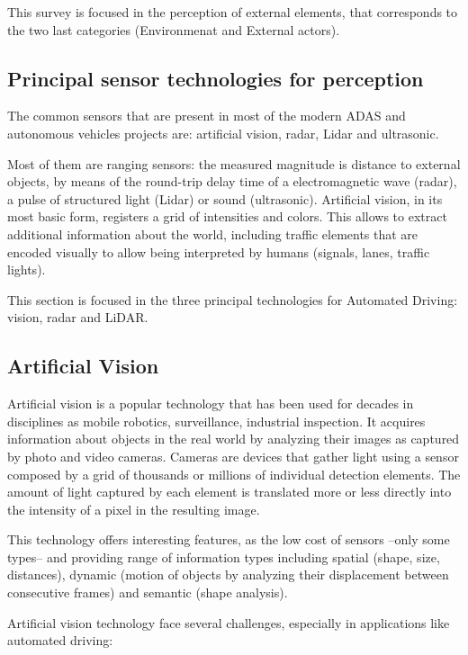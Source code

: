 This survey is focused in the perception of external elements, that corresponds to the
two last categories (Environmenat and External actors).

\subsection{Principal sensor technologies for perception}

The common sensors that are present in most of the modern ADAS and autonomous vehicles projects are: artificial vision, radar, Lidar and ultrasonic.

Most of them are ranging sensors: the measured magnitude is distance to 
external objects, by means of the round-trip delay time of a electromagnetic 
wave (radar), a pulse of structured light (Lidar) or sound (ultrasonic).
Artificial vision, in its most basic form, registers a grid of intensities and 
colors. This allows to extract additional information about the world, including 
traffic elements that are encoded visually to allow being interpreted by humans 
(signals, lanes, traffic lights).

This section is focused in the three principal technologies for Automated 
Driving: vision, radar and LiDAR.


\subsection{Artificial Vision}
Artificial vision is a popular technology that has been used for decades in 
disciplines as mobile robotics, surveillance, industrial inspection. It acquires
information about objects in the real world by analyzing their images as 
captured by photo and video cameras. Cameras are devices that gather light using
a sensor composed by a grid of thousands or millions of individual detection 
elements. The amount of light captured by each element is translated more or 
less directly into the intensity of a pixel in the resulting image. 

This technology offers interesting features, as the low cost of sensors --only 
some types-- and providing range of information types including spatial
(shape, size, distances), dynamic (motion of objects by analyzing their 
displacement between consecutive frames) and semantic (shape analysis).

Artificial vision technology face several challenges, especially in 
applications like automated driving:

